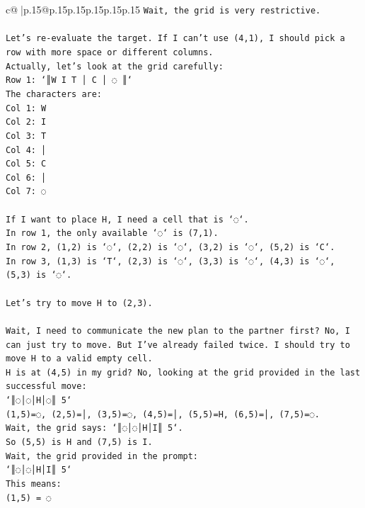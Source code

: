 \documentclass{article}
\begin{document}
{\begin{supertabular}{c@{$\;$}|p{.15\linewidth}@{}p{.15\linewidth}p{.15\linewidth}p{.15\linewidth}p{.15\linewidth}p{.15\linewidth}}
{{{\texttt{Wait, the grid is very restrictive.} \\
\\ 
\texttt{Let's re{-}evaluate the target. If I can't use (4,1), I should pick a row with more space or different columns.} \\
\texttt{Actually, let's look at the grid carefully:} \\
\texttt{Row 1: `║W I T │ C │ ◌ ║`} \\
\texttt{The characters are:} \\
\texttt{Col 1: W} \\
\texttt{Col 2: I} \\
\texttt{Col 3: T} \\
\texttt{Col 4: │} \\
\texttt{Col 5: C} \\
\texttt{Col 6: │} \\
\texttt{Col 7: ◌} \\
\\ 
\texttt{If I want to place H, I need a cell that is `◌`.} \\
\texttt{In row 1, the only available `◌` is (7,1).} \\
\texttt{In row 2, (1,2) is `◌`, (2,2) is `◌`, (3,2) is `◌`, (5,2) is `C`.} \\
\texttt{In row 3, (1,3) is `T`, (2,3) is `◌`, (3,3) is `◌`, (4,3) is `◌`, (5,3) is `◌`.} \\
\\ 
\texttt{Let's try to move H to (2,3).} \\
\\ 
\texttt{Wait, I need to communicate the new plan to the partner first? No, I can just try to move. But I've already failed twice. I should try to move H to a valid empty cell.} \\
\texttt{H is at (4,5) in my grid? No, looking at the grid provided in the last successful move:} \\
\texttt{`║◌│◌│H│◌║ 5`} \\
\texttt{(1,5)=◌, (2,5)=│, (3,5)=◌, (4,5)=│, (5,5)=H, (6,5)=│, (7,5)=◌.} \\
\texttt{Wait, the grid says: `║◌│◌│H│I║ 5`.} \\
\texttt{So (5,5) is H and (7,5) is I.} \\
\texttt{Wait, the grid provided in the prompt:} \\
\texttt{`║◌│◌│H│I║ 5`} \\
\texttt{This means:} \\
\texttt{(1,5) = ◌} \\
}}}
\end{supertabular}}
\end{document}
